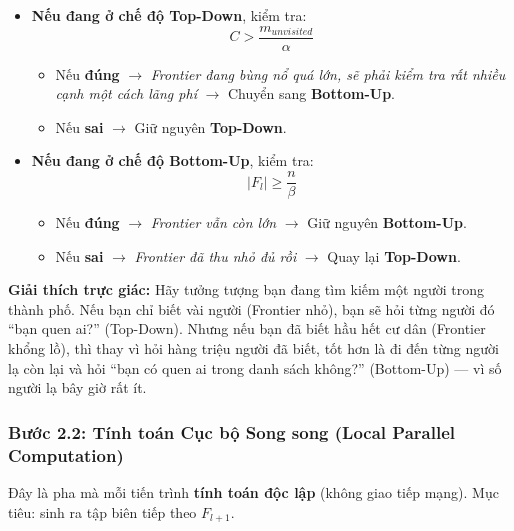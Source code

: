 \documentclass[12pt,a4paper]{article}
\begin{document}
\begin{itemize}
  \item \textbf{Nếu đang ở chế độ Top-Down}, kiểm tra:
  \begin{equation}
  C > \frac{m_{unvisited}}{\alpha}
  \end{equation}
  \begin{itemize}
    \item Nếu \textbf{đúng} $\rightarrow$ \textit{Frontier đang bùng nổ quá lớn, sẽ phải kiểm tra rất nhiều cạnh một cách lãng phí} $\rightarrow$ Chuyển sang \textbf{Bottom-Up}.
    \item Nếu \textbf{sai} $\rightarrow$ Giữ nguyên \textbf{Top-Down}.
  \end{itemize}

  \item \textbf{Nếu đang ở chế độ Bottom-Up}, kiểm tra:
  \begin{equation}
  |F_l| \geq \frac{n}{\beta}
  \end{equation}
  \begin{itemize}
    \item Nếu \textbf{đúng} $\rightarrow$ \textit{Frontier vẫn còn lớn} $\rightarrow$ Giữ nguyên \textbf{Bottom-Up}.
    \item Nếu \textbf{sai} $\rightarrow$ \textit{Frontier đã thu nhỏ đủ rồi} $\rightarrow$ Quay lại \textbf{Top-Down}.
  \end{itemize}
\end{itemize}

\begin{explain}
\textbf{Giải thích trực giác:} Hãy tưởng tượng bạn đang tìm kiếm một người trong thành phố. Nếu bạn chỉ biết vài người (Frontier nhỏ), bạn sẽ hỏi từng người đó ``bạn quen ai?'' (Top-Down). Nhưng nếu bạn đã biết hầu hết cư dân (Frontier khổng lồ), thì thay vì hỏi hàng triệu người đã biết, tốt hơn là đi đến từng người lạ còn lại và hỏi ``bạn có quen ai trong danh sách không?'' (Bottom-Up) --- vì số người lạ bây giờ rất ít.
\end{explain}

\subsubsection{Bước 2.2: Tính toán Cục bộ Song song (Local Parallel Computation)}

Đây là pha mà mỗi tiến trình \textbf{tính toán độc lập} (không giao tiếp mạng). Mục tiêu: sinh ra tập biên tiếp theo $F_{l+1}$.
\end{document}
